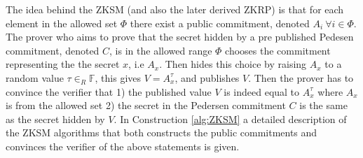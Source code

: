 The idea behind the ZKSM (and also the later derived ZKRP) is that for each element in the allowed set $\Phi$ there exist a public commitment, denoted $A_i\: \forall i\in\Phi$. The prover who aims to prove that the secret hidden by a pre published Pedesen commitment, denoted $C$, is in the allowed range $\Phi$ chooses the commitment representing the the secret $x$, i.e $A_x$. Then hides this choice by raising $A_x$  to a random value $\tau\in_R\mathds{F}$, this gives $V = A_x^\tau$, and publishes $V$. Then the prover has to convince the verifier that  1) the published value $V$ is indeed equal to  $A_x^\tau$ where $A_x$ is from the allowed set  2) the secret in the Pedersen commitment $C$  is the same as the secret hidden by $V$.
In Construction \ref{alg:ZKSM}  a detailed description of the ZKSM algorithms that both constructs the public commitments and convinces the verifier of the above statements is given. 
